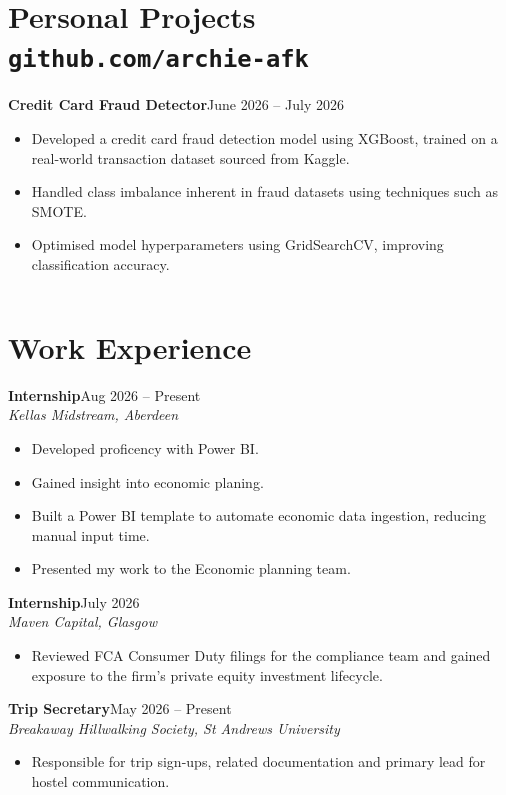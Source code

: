 \documentclass[10pt, a4paper]{article}
\newcommand{\entry}[3]{%
  \vspace{3pt}
  \noindent
  \textbf{\color{charcoal}#1}\hfill{\color{mgrey}\small #3}\\[-2pt]
  {\color{myblue}\itshape\small #2}
  \vspace{1pt}
}
\begin{document}
\section{Personal Projects \hfill \texttt{github.com/archie-afk}}

\entry{Credit Card Fraud Detector}{}{June 2026 -- July 2026}
\begin{itemize}
  \item Developed a credit card fraud detection model using XGBoost, trained on a real-world transaction dataset sourced from Kaggle.
  \item Handled class imbalance inherent in fraud datasets using techniques such as SMOTE.
  \item Optimised model hyperparameters using GridSearchCV, improving classification accuracy.
\end{itemize}

\vspace{2pt}
\begin{tabularx}{\textwidth}{@{}X r@{}}
  
\end{tabularx}

\section{Work Experience}

\entry{Internship}{Kellas Midstream, Aberdeen}{Aug 2026 -- Present}
\begin{itemize}
  \item Developed proficency with Power BI.
  \item Gained insight into economic planing.
  \item Built a Power BI template to automate economic data ingestion, reducing manual input time.
  \item Presented my work to the Economic planning team.
\end{itemize}

\entry{Internship}{Maven Capital, Glasgow}{July 2026}
\begin{itemize}
  \item Reviewed FCA Consumer Duty filings for the compliance team and gained exposure to the firm's private equity investment lifecycle.
\end{itemize}

\entry{Trip Secretary}{Breakaway Hillwalking Society, St Andrews University}{May 2026 -- Present}
\begin{itemize}
  \item Responsible for trip sign-ups, related documentation and primary lead for hostel communication.
\end{itemize}
\end{document}
